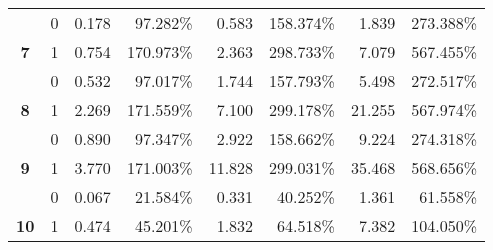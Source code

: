 \begin{table}
\begin{tabular}[t]{>{}ccrrrrrr}
\rule{0pt}{4ex}
 & 0 & 0.178 & 97.282\% & 0.583 & 158.374\% & 1.839 & 273.388\%\\

\multirow[t]{-2}{*}{\centering\arraybackslash \textbf{7}} & 1 & 0.754 & 170.973\% & 2.363 & 298.733\% & 7.079 & 567.455\%\\

 & 0 & 0.532 & 97.017\% & 1.744 & 157.793\% & 5.498 & 272.517\%\\

\multirow[t]{-2}{*}{\centering\arraybackslash \textbf{8}} & 1 & 2.269 & 171.559\% & 7.100 & 299.178\% & 21.255 & 567.974\%\\

 & 0 & 0.890 & 97.347\% & 2.922 & 158.662\% & 9.224 & 274.318\%\\

\multirow[t]{-2}{*}{\centering\arraybackslash \textbf{9}} & 1 & 3.770 & 171.003\% & 11.828 & 299.031\% & 35.468 & 568.656\%\\

\rule{0pt}{4ex}
 & 0 & 0.067 & 21.584\% & 0.331 & 40.252\% & 1.361 & 61.558\%\\

\multirow[t]{-2}{*}{\centering\arraybackslash \textbf{10}} & 1 & 0.474 & 45.201\% & 1.832 & 64.518\% & 7.382 & 104.050\%\\
\bottomrule
\end{tabular}
\end{table}
